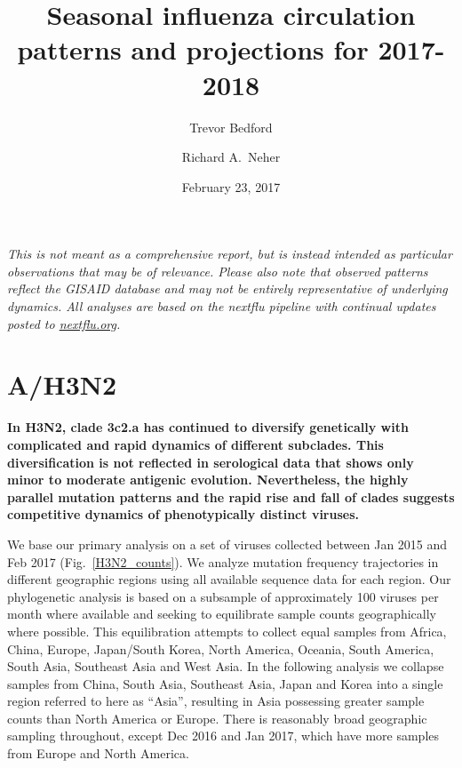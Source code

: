 \documentclass[11pt,oneside,letterpaper]{article}
\title{\vspace{2cm} \LARGE \bf
Seasonal influenza circulation patterns and projections for 2017-2018
}
\author[1]{Trevor Bedford}
\author[2]{Richard A.\ Neher}
\affil[1]{Vaccine and Infectious Disease Division, Fred Hutchinson Cancer Research Center, Seattle, WA, USA}
\affil[2]{Biozentrum, University of Basel, Basel, Switzerland}
\date{February 23, 2017}
\begin{document}
\maketitle

\textit{This is not meant as a comprehensive report, but is instead intended as particular observations that may be of relevance. Please also note that observed patterns reflect the GISAID database and may not be entirely representative of underlying dynamics. All analyses are based on the nextflu pipeline \cite{neher2015nextflu} with continual updates posted to \href{http://nextflu.org}{nextflu.org}.}

\tableofcontents

\pagebreak

\section*{A/H3N2}

\textbf{In H3N2, clade 3c2.a has continued to diversify genetically with complicated and rapid dynamics of different subclades.
This diversification is not reflected in serological data that shows only minor to moderate antigenic evolution.
Nevertheless, the highly parallel mutation patterns and the rapid rise and fall of clades suggests competitive dynamics of phenotypically distinct viruses.}

We base our primary analysis on a set of viruses collected between Jan 2015 and Feb 2017 (Fig.\ \ref{H3N2_counts}).
We analyze mutation frequency trajectories in different geographic regions using all available sequence data for each region.
Our phylogenetic analysis is based on a subsample of approximately 100 viruses per month where available and seeking to equilibrate sample counts geographically where possible.
This equilibration attempts to collect equal samples from Africa, China, Europe, Japan/South Korea, North America, Oceania, South America, South Asia, Southeast Asia and West Asia.
In the following analysis we collapse samples from China, South Asia, Southeast Asia, Japan and Korea into a single region referred to here as ``Asia'', resulting in Asia possessing greater sample counts than North America or Europe.
There is reasonably broad geographic sampling throughout, except Dec 2016 and Jan 2017, which have more samples from Europe and North America.
\end{document}
